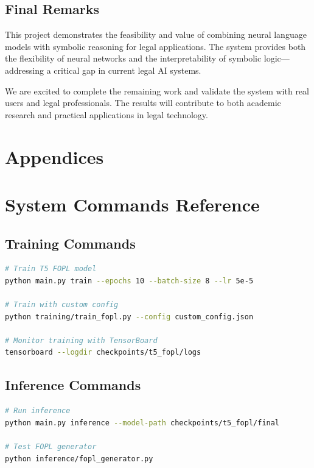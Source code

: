 \documentclass[12pt,a4paper]{article}
\begin{document}
\subsection{Final Remarks}

This project demonstrates the feasibility and value of combining neural language models with symbolic reasoning for legal applications. The system provides both the flexibility of neural networks and the interpretability of symbolic logic—addressing a critical gap in current legal AI systems.

We are excited to complete the remaining work and validate the system with real users and legal professionals. The results will contribute to both academic research and practical applications in legal technology.

\newpage

\section*{Appendices}

\appendix

\section{System Commands Reference}

\subsection{Training Commands}

\begin{lstlisting}[language=bash]
# Train T5 FOPL model
python main.py train --epochs 10 --batch-size 8 --lr 5e-5

# Train with custom config
python training/train_fopl.py --config custom_config.json

# Monitor training with TensorBoard
tensorboard --logdir checkpoints/t5_fopl/logs
\end{lstlisting}

\subsection{Inference Commands}

\begin{lstlisting}[language=bash]
# Run inference
python main.py inference --model-path checkpoints/t5_fopl/final

# Test FOPL generator
python inference/fopl_generator.py
\end{lstlisting}
\end{document}
